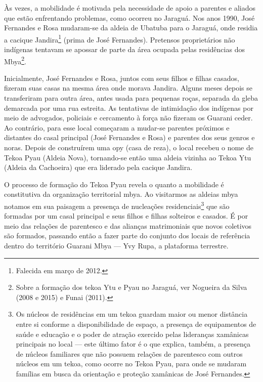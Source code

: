\documentclass{article}
\begin{document}
\`As vezes, a mobilidade \'e motivada pela necessidade de apoio a
parentes e aliados que est\~ao enfrentando problemas, como ocorreu no
Jaragu\'a. Nos anos 1990, Jos\'e Fernandes e Rosa mudaram-se da aldeia
de Ubatuba para o Jaragu\'a, onde residia a cacique Jandira\footnote{
Falecida em mar\c{c}o de 2012.} (prima de Jos\'e Fernandes). Pretensos
propriet\'arios n\~ao ind\'igenas tentavam se apossar de parte da
\'area ocupada pelas resid\^encias dos Mbya\footnote{ Sobre a
forma\c{c}\~ao dos tekoa Ytu e Pyau no Jaragu\'a, ver Nogueira da Silva
(2008 e 2015) e Funai (2011). }. 

Inicialmente, Jos\'e Fernandes e Rosa, juntos com seus filhos e filhas
casados, fizeram suas casas na mesma \'area onde morava Jandira. Alguns
meses depois se transferiram para outra \'area, antes usada para
pequenas ro\c{c}as, separada da gleba demarcada por uma rua estreita.
As tentativas de intimida\c{c}\~ao dos ind\'igenas por meio de
advogados, policiais e cercamento \`a for\c{c}a n\~ao fizeram os
Guarani ceder. Ao contr\'ario, para esse local come\c{c}aram a mudar-se
parentes pr\'oximos e distantes do casal principal (Jos\'e Fernandes e
Rosa) e parentes dos seus genros e noras. Depois de constru\'irem uma
opy (casa de reza), o local recebeu o nome de Tekoa Pyau (Aldeia Nova),
tornando-se ent\~ao uma aldeia vizinha ao Tekoa Ytu (Aldeia da
Cachoeira) que era liderado pela cacique Jandira.

O processo de forma\c{c}\~ao do Tekoa Pyau revela o quanto a mobilidade
\'e constitutiva da organiza\c{c}\~ao territorial mbya. Ao visitarmos
as aldeias mbya notamos em sua paisagem a presen\c{c}a de
nuclea\c{c}\~oes residenciais\footnote{ Os n\'ucleos de resid\^encias
em um tekoa guardam maior ou menor dist\^ancia entre si conforme a
disponibilidade de espa\c{c}o, a presen\c{c}a de equipamentos de
sa\'ude e educa\c{c}\~ao e o poder de atra\c{c}\~ao exercido pelas
lideran\c{c}as xam\^anicas principais no local --- este \'ultimo fator
\'e o que explica, tamb\'em, a presen\c{c}a de n\'ucleos familiares que
n\~ao possuem rela\c{c}\~oes de parentesco com outros n\'ucleos em um
tekoa, como ocorre no Tekoa Pyau, para onde se mudaram fam\'ilias em
busca da orienta\c{c}\~ao e prote\c{c}\~ao xam\^anicas de Jos\'e
Fernandes.} que s\~ao formadas por um casal principal e seus filhos e
filhas solteiros e casados. \'E por meio das rela\c{c}\~oes de
parentesco e das alian\c{c}as matrimoniais que novos coletivos s\~ao
formados, passando ent\~ao a fazer parte do conjunto dos locais de
refer\^encia dentro do territ\'orio Guarani Mbya --- Yvy Rupa, a
plataforma terrestre.
\end{document}

